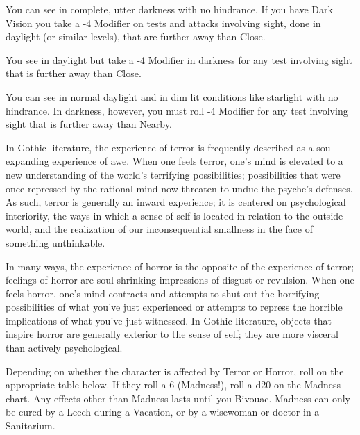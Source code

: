 {     

  You can see in complete, utter darkness with no hindrance.  If you have Dark Vision you take a -4 Modifier on tests and attacks involving sight, done in daylight (or similar levels), that are further away than Close. 


  You see in daylight but take a -4 Modifier in darkness for any test involving sight that is further away than Close. 


  You can see in normal daylight and in dim lit conditions like starlight with no hindrance. In darkness, however, you must roll -4 Modifier for any test involving sight that is further away than Nearby.


   

  In Gothic literature, the experience of terror is frequently described as a soul-expanding experience of awe. When one feels terror, one's mind is elevated to a new understanding of the world's terrifying possibilities; possibilities that were once repressed by the rational mind now threaten to undue the psyche's defenses. As such, terror is generally an inward experience; it is centered on psychological interiority, the ways in which a sense of self is located in relation to the outside world, and the realization of our inconsequential smallness in the face of something unthinkable.

  In many ways, the experience of horror is the opposite of the experience of terror; feelings of horror are soul-shrinking impressions of disgust or revulsion. When one feels horror, one's mind contracts and attempts to shut out the horrifying possibilities of what you've just experienced or attempts to repress the horrible implications of what you've just witnessed. In Gothic literature, objects that inspire horror are generally exterior to the sense of self; they are more visceral than actively psychological.


  Depending on whether the character is affected by Terror or Horror, roll on the appropriate table below.  If they roll a 6 (Madness!), roll a d20 on the Madness chart.  Any effects other than Madness lasts until you Bivouac. Madness can only be cured by a Leech during a Vacation, or by a wisewoman or doctor in a Sanitarium. 

}
